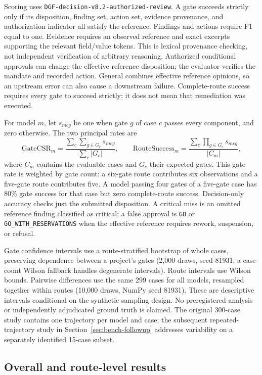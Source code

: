 Scoring uses \texttt{DGF-decision-v8.2-authorized-review}. A gate succeeds strictly only if its
disposition, finding set, action set, evidence provenance, and authorization indicator all satisfy
the reference. Findings and actions require F1 equal to one. Evidence requires an observed
reference and exact excerpts supporting the relevant field/value tokens. This is lexical
provenance checking, not independent verification of arbitrary reasoning. Authorized conditional
approvals can change the effective reference disposition; the evaluator verifies the mandate
and recorded action. General combines effective reference opinions, so an upstream error can
also cause a downstream failure. Complete-route success requires every gate to succeed strictly;
it does not mean that remediation was executed.

For model $m$, let $s_{mcg}$ be one when gate $g$ of case $c$ passes every component, and
zero otherwise. The two principal rates are
\[
\mathrm{GateCSR}_m=\frac{\sum_c\sum_{g\in G_c}s_{mcg}}{\sum_c |G_c|},
\qquad
\mathrm{RouteSuccess}_m=\frac{\sum_c\prod_{g\in G_c}s_{mcg}}{|C_m|},
\]
where $C_m$ contains the evaluable cases and $G_c$ their expected gates. This gate rate is
weighted by gate count: a six-gate route contributes six observations and a five-gate route
contributes five. A model passing four gates of a five-gate case has 80\% gate success for that
case but zero complete-route success. Decision-only accuracy checks just the submitted
disposition. A critical miss is an omitted reference finding classified as critical; a false
approval is \texttt{GO} or \texttt{GO\_WITH\_RESERVATIONS} when the effective reference requires
rework, suspension, or refusal.

Gate confidence intervals use a route-stratified bootstrap of whole cases, preserving dependence
between a project's gates (2,000 draws, seed 81931; a case-count Wilson fallback handles degenerate
intervals). Route intervals use Wilson bounds. Pairwise differences use the same 299 cases for
all models, resampled together within routes (10,000 draws, NumPy seed 81931). These are descriptive
intervals conditional on the synthetic sampling design. No preregistered analysis or independently
adjudicated ground truth is claimed. The original 300-case study contains one trajectory per
model and case; the subsequent repeated-trajectory study in Section~\ref{sec:bench-followup}
addresses variability on a separately identified 15-case subset.

\subsection{Overall and route-level results}

